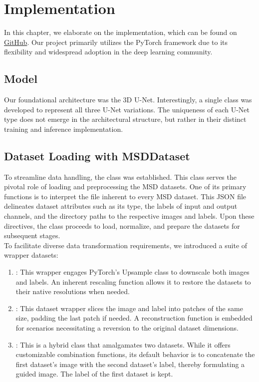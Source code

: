 \chapter{Implementation}
In this chapter, we elaborate on the implementation, which can be found on \href{https://github.com/janiswehen/hpi-ml-ba}{GitHub}. Our project primarily utilizes the PyTorch framework due to its flexibility and widespread adoption in the deep learning community.
\section{Model}
Our foundational architecture was the $3$D U-Net. Interestingly, a single  class was developed to represent all three U-Net variations. The uniqueness of each U-Net type does not emerge in the architectural structure,
but rather in their distinct training and inference implementation.
\section{Dataset Loading with MSDDataset}
To streamline data handling, the  class was established. This class serves the pivotal role of loading and preprocessing the MSD datasets.
One of its primary functions is to interpret the  file inherent to every MSD dataset. This JSON file delineates dataset attributes such as its type, the labels of input and output channels,
and the directory paths to the respective images and labels. Upon these directives, the  class proceeds to load, normalize, and prepare the datasets for subsequent stages.\\
To facilitate diverse data transformation requirements, we introduced a suite of wrapper datasets:
\begin{enumerate}
	\item {}: This wrapper engages PyTorch's Upsample class to downscale both images and labels. An inherent rescaling function allows it to restore the datasets to their native resolutions when needed.
	\item {}: This dataset wrapper slices the image and label into patches of the same size, padding the last patch if needed. A reconstruction function is embedded for scenarios necessitating a reversion to the original dataset dimensions.
    \item {}: This is a hybrid class that amalgamates two datasets. While it offers customizable combination functions,
	its default behavior is to concatenate the first dataset's image with the second dataset's label, thereby formulating a guided image. The label of the first dataset is kept.
\end{enumerate}

